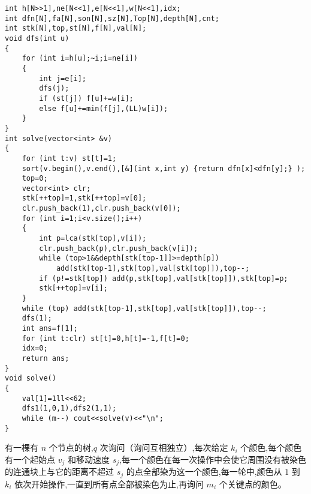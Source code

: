 \documentclass[a4paper]{ctexart}
\begin{document}
\begin{lstlisting}
int h[N>>1],ne[N<<1],e[N<<1],w[N<<1],idx;
int dfn[N],fa[N],son[N],sz[N],Top[N],depth[N],cnt;
int stk[N],top,st[N],f[N],val[N];
void dfs(int u)
{
    for (int i=h[u];~i;i=ne[i])
    {
        int j=e[i];
        dfs(j);
        if (st[j]) f[u]+=w[i];
        else f[u]+=min(f[j],(LL)w[i]);
    }
}
int solve(vector<int> &v)
{
    for (int t:v) st[t]=1;
    sort(v.begin(),v.end(),[&](int x,int y) {return dfn[x]<dfn[y];} );
    top=0;
    vector<int> clr;
    stk[++top]=1,stk[++top]=v[0];
    clr.push_back(1),clr.push_back(v[0]);
    for (int i=1;i<v.size();i++)
    {
        int p=lca(stk[top],v[i]);
        clr.push_back(p),clr.push_back(v[i]);
        while (top>1&&depth[stk[top-1]]>=depth[p])
            add(stk[top-1],stk[top],val[stk[top]]),top--;
        if (p!=stk[top]) add(p,stk[top],val[stk[top]]),stk[top]=p;
        stk[++top]=v[i];
    }
    while (top) add(stk[top-1],stk[top],val[stk[top]]),top--;
    dfs(1);
    int ans=f[1];
    for (int t:clr) st[t]=0,h[t]=-1,f[t]=0;
    idx=0;
    return ans;
}
void solve()
{
    val[1]=1ll<<62;
    dfs1(1,0,1),dfs2(1,1);
    while (m--) cout<<solve(v)<<"\n";
}
\end{lstlisting}
有一棵有 $n$ 个节点的树,$q$ 次询问（询问互相独立）,每次给定 $k_i$ 个颜色,每个颜色有一个起始点 $v_j$ 和移动速度 $s_j$,每一个颜色在每一次操作中会使它周围没有被染色的连通块上与它的距离不超过 $s_j$ 的点全部染为这一个颜色,每一轮中,颜色从 $1$ 到 $k_i$ 依次开始操作,一直到所有点全部被染色为止,再询问 $m_i$ 个关键点的颜色。
\end{document}
